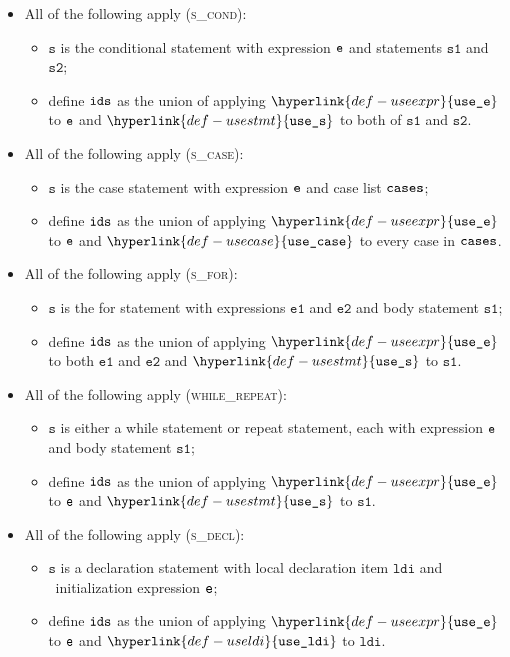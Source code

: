 \documentclass{book}
\newcommand\useexpr[0]{\hyperlink{def-useexpr}{\texttt{use\_e}}}
\newcommand\usestmt[0]{\hyperlink{def-usestmt}{\texttt{use\_s}}}
\newcommand\useldi[0]{\hyperlink{def-useldi}{\texttt{use\_ldi}}}
\newcommand\usecase[0]{\hyperlink{def-usecase}{\texttt{use\_case}}}
\newcommand\veone[0]{\texttt{e1}}
\newcommand\vetwo[0]{\texttt{e2}}
\newcommand\vs[0]{\texttt{s}}
\newcommand\vsone[0]{\texttt{s1}}
\newcommand\vstwo[0]{\texttt{s2}}
\newcommand\ldi[0]{\texttt{ldi}}
\begin{document}
\begin{itemize}
  \item All of the following apply (\textsc{s\_cond}):
  \begin{itemize}
    \item $\vs$ is the conditional statement with expression $\texttt{e}$ and statements $\vsone$ and $\vstwo$;
    \item define $\texttt{ids}$ as the union of applying $\useexpr$ to $\texttt{e}$ and $\usestmt$ to both of $\vsone$ and $\vstwo$.
  \end{itemize}

  \item All of the following apply (\textsc{s\_case}):
  \begin{itemize}
    \item $\vs$ is the case statement with expression $\texttt{e}$ and case list $\texttt{cases}$;
    \item define $\texttt{ids}$ as the union of applying $\useexpr$ to $\texttt{e}$ and $\usecase$ to every case in $\texttt{cases}$.
  \end{itemize}

  \item All of the following apply (\textsc{s\_for}):
  \begin{itemize}
    \item $\vs$ is the for statement with expressions $\veone$ and $\vetwo$ and body statement $\vsone$;
    \item define $\texttt{ids}$ as the union of applying $\useexpr$ to both $\veone$ and $\vetwo$ and $\usestmt$ to $\vsone$.
  \end{itemize}

  \item All of the following apply (\textsc{while\_repeat}):
  \begin{itemize}
    \item $\vs$ is either a while statement or repeat statement, each with expression $\texttt{e}$ and body statement $\vsone$;
    \item define $\texttt{ids}$ as the union of applying $\useexpr$ to $\texttt{e}$ and $\usestmt$ to $\vsone$.
  \end{itemize}

  \item All of the following apply (\textsc{s\_decl}):
  \begin{itemize}
    \item $\vs$ is a declaration statement with local declaration item $\ldi$ and \optional\ initialization expression $\texttt{e}$;
    \item define $\texttt{ids}$ as the union of applying $\useexpr$ to $\texttt{e}$ and $\useldi$ to $\ldi$.
  \end{itemize}


\end{itemize}
\end{document}
